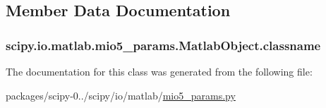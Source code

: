 \subsection{Member Data Documentation}
\hypertarget{classscipy_1_1io_1_1matlab_1_1mio5__params_1_1MatlabObject_ab74473403e05b10c6a36cd8a97fd992d}{}
\subsubsection[{classname}]{\setlength{\rightskip}{0pt plus 5cm}scipy.\+io.\+matlab.\+mio5\+\_\+params.\+Matlab\+Object.\+classname}\label{classscipy_1_1io_1_1matlab_1_1mio5__params_1_1MatlabObject_ab74473403e05b10c6a36cd8a97fd992d}


The documentation for this class was generated from the following file\+:\begin{DoxyCompactItemize}
\item 
packages/scipy-\/0../scipy/io/matlab/\hyperlink{mio5__params_8py}{mio5\+\_\+params.\+py}\end{DoxyCompactItemize}

